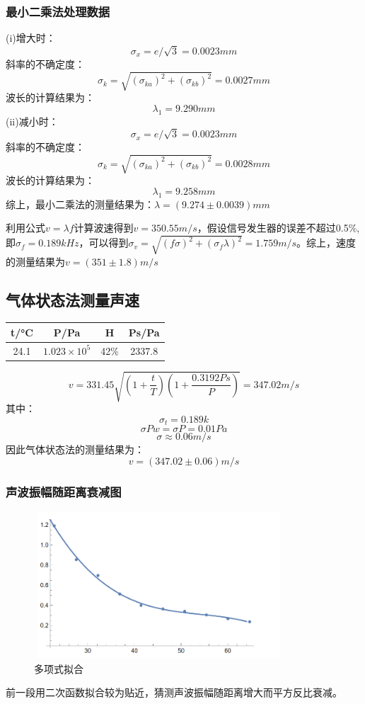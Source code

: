 \documentclass[a4paper, 10pt]{article}
\begin{document}
\subsubsection{最小二乘法处理数据}
\noindent (i)增大时：
$$\sigma_{x}=e/\sqrt{3}=0.0023mm$$
\noindent 斜率的不确定度：
$$\sigma_{k}=\sqrt{(\sigma_{ka})^2+(\sigma_{kb})^2}=0.0027mm$$
波长的计算结果为：
$$\lambda_1=9.290mm$$
\noindent (ii)减小时：
$$\sigma_{x}=e/\sqrt{3}=0.0023mm$$
\noindent 斜率的不确定度：
$$\sigma_{k}=\sqrt{(\sigma_{ka})^2+(\sigma_{kb})^2}=0.0028mm$$
波长的计算结果为：
$$\lambda_1=9.258mm$$
综上，最小二乘法的测量结果为：$\lambda=(9.274\pm0.0039)mm$

\noindent 利用公式$v=\lambda f$计算波速得到$v=350.55m/s$，假设信号发生器的误差不超过0.5\%,即$\sigma_f=0.189kHz$，可以得到$\sigma_v=\sqrt{(f\sigma)^2+(\sigma_f \lambda)^2}=1.759m/s$。综上，速度的测量结果为$v=(351\pm1.8)m/s$
    \subsection{气体状态法测量声速}
\vspace{10pt}
    \begin{center}
        \begin{tabular}{|c|c|c|c|}
            \hline
            t/°C&P/Pa&H&Ps/Pa\\
            \hline
            24.1& $1.023\times 10^5$&42\%&2337.8\\
            \hline
    
        \end{tabular}
        \end{center}

$$v=331.45\sqrt{(1+\frac{t}{T})(1+\frac{0.3192Ps}{P})}=347.02m/s$$
其中：
$$\sigma_t=0.189k$$
$$\sigma Pw=\sigma P=0.01Pa$$
$$\sigma\approx 0.06m/s$$
因此气体状态法的测量结果为：
$$v=(347.02\pm0.06)m/s$$

\subsubsection{声波振幅随距离衰减图}
\begin{figure}[ht]
    \centering 
    \includegraphics[height=5.5cm,width=9.3cm]{pic1.png}
    
    \caption{多项式拟合}
    \label{3}
    
    \end{figure}
\noindent 前一段用二次函数拟合较为贴近，猜测声波振幅随距离增大而平方反比衰减。
\end{document}
